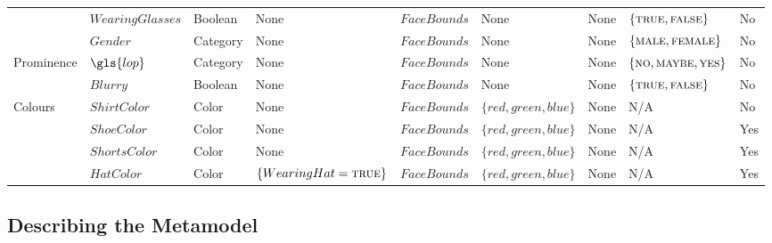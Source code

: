 \begin{landscape}
\begin{table}[p]
{\begin{tabular}{lllllllll}
        &
        $WearingGlasses$ &
        Boolean &
        None &
        $FaceBounds$ &
        None &
        None &
        $\{ \textsc{true}, \textsc{false} \}$&
        No
      \\
        &
        $Gender$ &
        Category &
        None &
        $FaceBounds$ &
        None &
        None &
        $\{ \textsc{male}, \textsc{female} \} $&
        No
      \\
      \midrule
        \multirow{2}{*}{Prominence} &
        $\gls{lop}$ &
        Category &
        None &
        $FaceBounds$ &
        None &
        None &
        $\{ \textsc{no}, \textsc{maybe}, \textsc{yes} \}$ &
        No
      \\
        &
        $Blurry$ &
        Boolean &
        None &
        $FaceBounds$ &
        None &
        None &
        $\{ \textsc{true}, \textsc{false} \}$&
        No
      \\
      \midrule
        \multirow{2}{*}{Colours} &
        $ShirtColor$ &
        Color &
        None &
        $FaceBounds$ &
        $\{ red, green, blue \}$ &
        None &
        N/A &
        No
      \\
        &
        $ShoeColor$ &
        Color &
        None &
        $FaceBounds$ &
        $\{ red, green, blue \}$ &
        None &
        N/A &
        Yes
      \\
        &
        $ShortsColor$ &
        Color &
        None &
        $FaceBounds$ &
        $\{ red, green, blue \}$ &
        None &
        N/A &
        Yes
      \\
        &
        $HatColor$ &
        Color &
        $\{ WearingHat = \textsc{true} \}$ &
        $FaceBounds$ &
        $\{ red, green, blue \}$ &
        None &
        N/A &
        Yes
      \\
      \bottomrule
    \end{tabular}
  }
\end{table}

\end{landscape}


\subsection{Describing the Metamodel}

